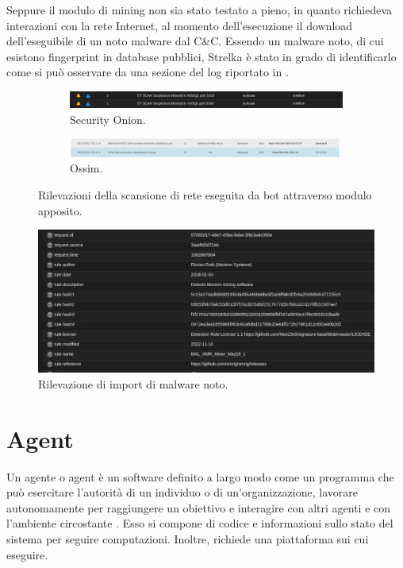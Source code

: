 Seppure il modulo di mining non sia stato testato a pieno, in quanto richiedeva interazioni con la rete Internet, al momento dell'esecuzione il download dell'eseguibile di un noto malware dal C\&C. Essendo un malware noto, di cui esistono fingerprint in database pubblici, Strelka è stato in grado di identificarlo come si può osservare da una sezione del log riportato in .


\begin{figure}[hbtp]
    \centering
    \begin{subfigure}{\textwidth}
        \centering
        \includegraphics[width=\textwidth]{res/fig/byob-result-2.png}
        \caption{Security Onion.}
        \label{fig:byob-result-2}
    \end{subfigure}
    \hfill
    \begin{subfigure}{\textwidth}
        \centering
        \includegraphics[width=\textwidth]{res/fig/byob-result-3.png}
        \caption{Ossim.}
        \label{fig:byob-result-3}
    \end{subfigure}
    \caption{Rilevazioni della scansione di rete eseguita da bot attraverso modulo apposito.}
    \label{fig:byob-results-2-3}
\end{figure}
\begin{figure}[hbtp]
    \centering
    \includegraphics[width=\textwidth]{res/fig/byob-strelka.png}
    \caption{Rilevazione di import di malware noto.}
    \label{fig:byob-results-4}
\end{figure}


\chapter{Agent}
Un agente o agent è un software  definito a largo modo  come un programma che può esercitare l'autorità di un individuo o di un'organizzazione, lavorare autonomamente per raggiungere un obiettivo e interagire con altri agenti e con l'ambiente circostante \cite{jansen2002intrusion}. 
Esso si compone di codice e informazioni sullo stato del sistema per seguire computazioni. Inoltre, richiede una piattaforma sui cui eseguire.

